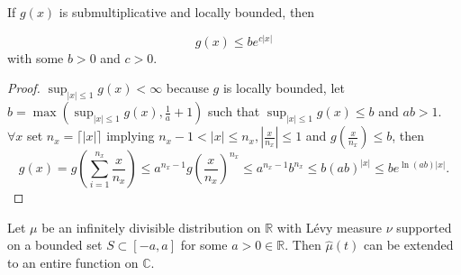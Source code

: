 \documentclass[a4paper,11pt]{article}
\begin{document}
\begin{lemma} \label{lem:exp bound}
    If $g(x)$ is submultiplicative and locally bounded, then

    \begin{equation}
        g(x) \leq b e^{c|x|}
    \end{equation}
    with some $b>0$ and $c>0$.
\end{lemma}

\begin{proof}
    $\sup _{|x| \leq 1} g(x) < \infty$ because $g$ is locally bounded, let $b = \max(\sup _{|x| \leq 1} g(x),\frac{1}{a}+1)$ such that $\sup _{|x| \leq 1} g(x)\le b$ and $ab>1$.
    $\forall x$ set $n_x = \lceil \left| x \right| \rceil$ implying $n_x-1 < \left| x \right| \leq n_x, |\frac{x}{n_x}|\le 1$ and $g(\frac{x}{n _{x}})\le b$, then
    \begin{equation}
        g(x) = g\left(\sum_{i=1}^{n_x} \frac{x}{n_x}\right)
        \leq a^{n_x-1} g\left(\frac{x}{n_x} \right)^{n_x} \leq a^{n_x-1} b^{n_x} \leq b(a b)^{|x|}
        \le b e^{\ln \left(ab\right)|x|}.
    \end{equation}
\end{proof}

\begin{lemma}\label{lem:supp entire}
    Let $\mu$ be an infinitely divisible distribution on $\mathbb{R} $ with Lévy measure $\nu$
    supported on a bounded set $S\subset[-a, a]$ for some $a>0 \in \mathbb{R}$.
    Then $\widehat{\mu}(t)$ can be extended to an entire function on $\mathbb{C}$.
\end{lemma}
\end{document}
